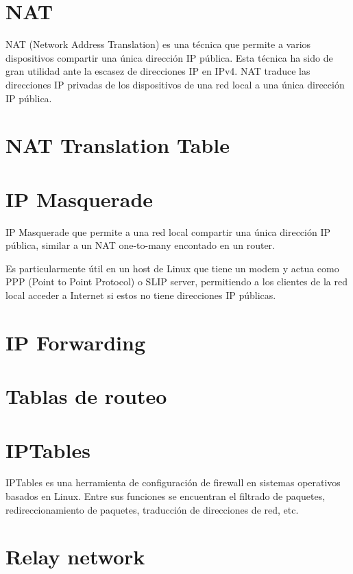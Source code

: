 \section{NAT} %
NAT (Network Address Translation) es una técnica que permite a varios dispositivos compartir una única dirección IP pública. 
Esta técnica ha sido de gran utilidad ante la escasez de direcciones IP en IPv4.
NAT traduce las direcciones IP privadas de los dispositivos de una red local a una única dirección IP pública.


\section{NAT Translation Table} %


\section{IP Masquerade} %

IP Masquerade que permite a una red local compartir una única dirección IP pública, similar a un NAT one-to-many encontado en un router.

Es particularmente útil en un host de Linux que tiene un modem y actua como PPP (Point to Point Protocol) o SLIP server, permitiendo a los clientes de la red local acceder a Internet si estos no tiene direcciones IP públicas.

\section{IP Forwarding} %



\section{Tablas de routeo}  


\section{IPTables} %
IPTables es una herramienta de configuración de firewall en sistemas operativos basados en Linux. Entre sus funciones se encuentran el filtrado de paquetes, redireccionamiento de paquetes, traducción de direcciones de red, etc.



\section{Relay network}%
